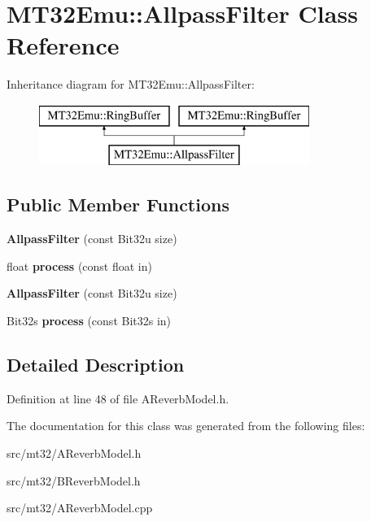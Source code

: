 \hypertarget{classMT32Emu_1_1AllpassFilter}{\section{M\-T32\-Emu\-:\-:Allpass\-Filter Class Reference}
\label{classMT32Emu_1_1AllpassFilter}
}
Inheritance diagram for M\-T32\-Emu\-:\-:Allpass\-Filter\-:\begin{figure}[H]
\begin{center}
\leavevmode
\includegraphics[height=2.000000cm]{classMT32Emu_1_1AllpassFilter}
\end{center}
\end{figure}
\subsection*{Public Member Functions}
\begin{DoxyCompactItemize}
\item 
\hypertarget{classMT32Emu_1_1AllpassFilter_a53ff10b78ac88570a86e8b0a45e5a56b}{{\bfseries Allpass\-Filter} (const Bit32u size)}\label{classMT32Emu_1_1AllpassFilter_a53ff10b78ac88570a86e8b0a45e5a56b}

\item 
\hypertarget{classMT32Emu_1_1AllpassFilter_a6241e1826d39ac1978d0ee8bac331710}{float {\bfseries process} (const float in)}\label{classMT32Emu_1_1AllpassFilter_a6241e1826d39ac1978d0ee8bac331710}

\item 
\hypertarget{classMT32Emu_1_1AllpassFilter_a53ff10b78ac88570a86e8b0a45e5a56b}{{\bfseries Allpass\-Filter} (const Bit32u size)}\label{classMT32Emu_1_1AllpassFilter_a53ff10b78ac88570a86e8b0a45e5a56b}

\item 
\hypertarget{classMT32Emu_1_1AllpassFilter_a77022f6804451a2b071df08c59016ee1}{Bit32s {\bfseries process} (const Bit32s in)}\label{classMT32Emu_1_1AllpassFilter_a77022f6804451a2b071df08c59016ee1}

\end{DoxyCompactItemize}


\subsection{Detailed Description}


Definition at line 48 of file A\-Reverb\-Model.\-h.



The documentation for this class was generated from the following files\-:\begin{DoxyCompactItemize}
\item 
src/mt32/A\-Reverb\-Model.\-h\item 
src/mt32/B\-Reverb\-Model.\-h\item 
src/mt32/A\-Reverb\-Model.\-cpp\end{DoxyCompactItemize}
